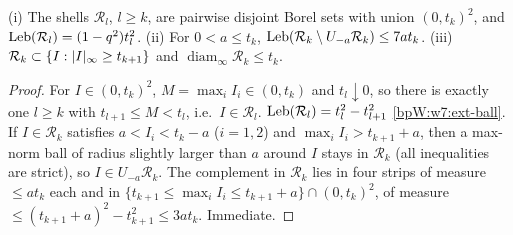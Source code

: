 \begin{lemma}\label{bpW:w7:shell-geom}
(i) The shells $\mathcal R_l$, $l\ge k$, are pairwise disjoint Borel sets with union $(0,t_k)^2$, and
$\operatorname{Leb}(\mathcal R_l)=(1-q^2)t_l^2$. (ii) For $0<a\le t_k$, $\operatorname{Leb}(\mathcal R_k\setminus U_{-a}\mathcal R_k)\le7at_k$.
(iii) $\mathcal R_k\subset\{I:\lvert I\rvert_\infty\ge t_{k+1}\}$ and $\operatorname{diam}_\infty\mathcal R_k\le t_k$.
\end{lemma}
\begin{proof}
\label{stepW:w7:partition}
For $I\in(0,t_k)^2$, $M=\max_iI_i\in(0,t_k)$ and $t_l\downarrow0$, so there is exactly one $l\ge k$ with
$t_{l+1}\le M<t_l$, i.e.\ $I\in\mathcal R_l$. $\operatorname{Leb}(\mathcal R_l)=t_l^2-t_{l+1}^2$ \ref{bpW:w7:ext-ball}.
\label{stepW:w7:layer}
If $I\in\mathcal R_k$ satisfies $a<I_i<t_k-a$ ($i=1,2$) and $\max_iI_i>t_{k+1}+a$, then a max-norm ball of radius
slightly larger than $a$ around $I$ stays in $\mathcal R_k$ (all inequalities are strict), so
$I\in U_{-a}\mathcal R_k$. The complement in $\mathcal R_k$ lies in four strips of measure $\le at_k$ each and in
$\{t_{k+1}\le\max_iI_i\le t_{k+1}+a\}\cap(0,t_k)^2$, of measure $\le(t_{k+1}+a)^2-t_{k+1}^2\le3at_k$.
\label{stepW:w7:shell-size}
Immediate.
\end{proof}

